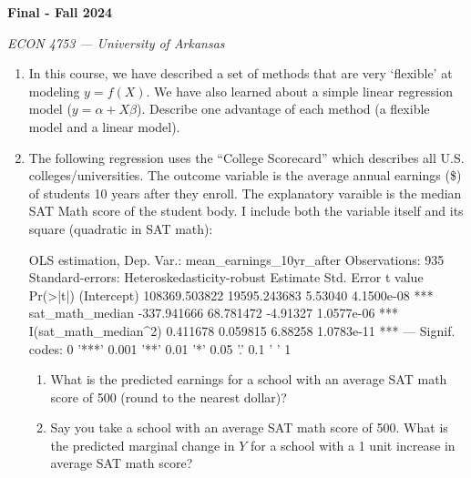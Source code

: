 \documentclass[12pt]{article}
\begin{document}
\begin{center}
  {\Huge\bf Final - Fall 2024}
  
  \smallskip
  {\large\it ECON 4753 — University of Arkansas}
\end{center}

\vspace{5mm}

\begin{enumerate}
  \item In this course, we have described a set of methods that are very `flexible' at modeling $y = f(X)$. We have also learned about a simple linear regression model ($y = \alpha + X \beta$). Describe one advantage of each method (a flexible model and a linear model).

  \bigskip
  \item The following regression uses the ``College Scorecard'' which describes all U.S. colleges/universities. The outcome variable is the average annual earnings (\$) of students 10 years after they enroll. The explanatory varaible is the median SAT Math score of the student body. I include both the variable itself and its square (quadratic in SAT math):
  \begin{codeblock}[{}]
OLS estimation, Dep. Var.: mean_earnings_10yr_after
Observations: 935
Standard-errors: Heteroskedasticity-robust 
                          Estimate   Std. Error  t value   Pr(>|t|)    
(Intercept)          108369.503822 19595.243683  5.53040 4.1500e-08 ***
sat_math_median        -337.941666    68.781472 -4.91327 1.0577e-06 ***
I(sat_math_median^2)      0.411678     0.059815  6.88258 1.0783e-11 ***
---
Signif. codes:  0 '***' 0.001 '**' 0.01 '*' 0.05 '.' 0.1 ' ' 1
  \end{codeblock}

  \begin{enumerate}[leftmargin = 2em]
    \item What is the predicted earnings for a school with an average SAT math score of 500 (round to the nearest dollar)? 
    
    \item Say you take a school with an average SAT math score of 500. What is the predicted marginal change in $Y$ for a school with a 1 unit increase in average SAT math score?
  \end{enumerate}
\end{enumerate}
  
\end{document}
